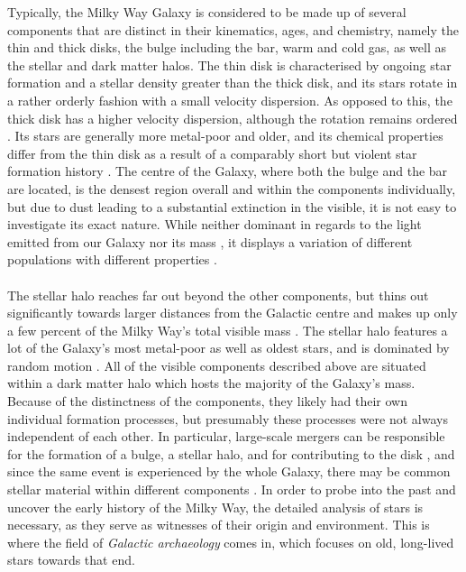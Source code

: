 \documentclass[a4paper,11pt]{article}
\begin{document}
%
Typically, the Milky Way Galaxy is considered to be made up of several components that are distinct in their kinematics, ages, and chemistry, namely the thin and thick disks, the bulge including the bar, warm and cold gas, as well as the stellar and dark matter halos. The thin disk is characterised by ongoing star formation and a stellar density greater than the thick disk, and its stars rotate in a rather orderly fashion with a small velocity dispersion. As opposed to this, the thick disk has a higher velocity dispersion, although the rotation remains ordered \citep[see, e.g.,][]{bensby14,sanders18}. Its stars are generally more metal-poor and older, and its chemical properties differ from the thin disk as a result of a comparably short but violent star formation history \citep[see, e.g.,][]{haywood15,schneider06}. The centre of the Galaxy, where both the bulge and the bar are located, is the densest region overall and within the components individually, but due to dust leading to a substantial extinction in the visible, it is not easy to investigate its exact nature. While neither dominant in regards to the light emitted from our Galaxy nor its mass \citep{shen10,licquia15}, it displays a variation of different populations with different properties \citep{carroll}.\\ \\
%
The stellar halo reaches far out beyond the other components, but thins out significantly towards larger distances from the Galactic centre and makes up only a few percent of the Milky Way’s total visible mass \citep{deason19}. The stellar halo features a lot of the Galaxy’s most metal-poor as well as oldest stars, and is dominated by random motion \citep[see, e.g.,][]{bland16}. All of the visible components described above are situated within a dark matter halo which hosts the majority of the Galaxy’s mass. Because of the distinctness of the components, they likely had their own individual formation processes, but presumably these processes were not always independent of each other. In particular, large-scale mergers can be responsible for the formation of a bulge, a stellar halo, and for contributing to the disk \citep{barnes92,zolotov09,quinn93}, and since the same event is experienced by the whole Galaxy, there may be common stellar material within different components \citep{helmi20}. In order to probe into the past and uncover the early history of the Milky Way, the detailed analysis of stars is necessary, as they serve as witnesses of their origin and environment. This is where the field of \emph{Galactic archaeology} comes in, which focuses on old, long-lived stars towards that end.
%
\end{document}
